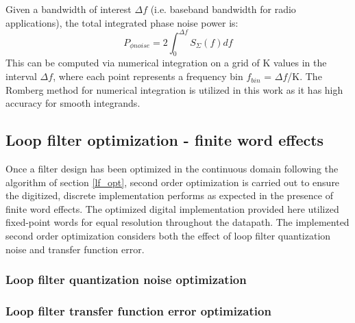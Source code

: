 	Given a bandwidth of interest $\Delta f$ (i.e. baseband bandwidth for radio applications), the total integrated phase noise power is:
	\begin{equation}
		P_{\phi noise} = 2\int_0^{\Delta f} S_{\Sigma}(f)df
	\end{equation}
	This can be computed via numerical integration on a grid of K values in the interval $\Delta f$, where each point represents a frequency bin $f_{bin}$ = $\Delta f$/K. The Romberg method for numerical integration \cite{numerical_methods_2011} is utilized in this work as it has high accuracy for smooth integrands.


\subsection{Loop filter optimization - finite word effects}
Once a filter design has been optimized in the continuous domain following the algorithm of section \ref{lf_opt}, second order optimization is carried out to ensure the digitized, discrete implementation performs as expected in the presence of finite word effects. The optimized digital implementation provided here utilized fixed-point words for equal resolution throughout the datapath. The implemented second order optimization considers both the effect of loop filter quantization noise and transfer function error.

\subsubsection{Loop filter quantization noise optimization}

\subsubsection{Loop filter transfer function error optimization}
